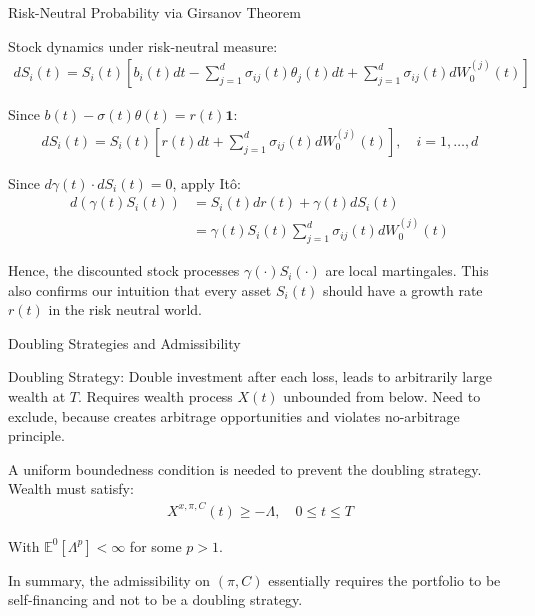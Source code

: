 \documentclass{beamer}
\begin{document}
\begin{frame}{Risk-Neutral Probability via Girsanov Theorem}

    {\footnotesize \footnotesize
    \par Stock dynamics under risk-neutral measure:
    \begin{align*}
        dS_i(t) = S_i(t) \left[ b_i(t)dt - \sum_{j=1}^d \sigma_{ij}(t)\theta_j(t)dt + \sum_{j=1}^d \sigma_{ij}(t)dW_0^{(j)}(t) \right]
    \end{align*}
    \par Since $b(t) - \sigma(t)\theta(t) = r(t)\mathbf{1}$:
    \begin{align*}
        dS_i(t) = S_i(t) \left[r(t)dt + \sum_{j=1}^d \sigma_{ij}(t)dW_0^{(j)}(t) \right], \quad i = 1, \ldots, d
    \end{align*}
    \par  \pause Since $d\gamma(t) \cdot dS_i(t) = 0$, apply Itô:
    \begin{align*}
        d(\gamma(t)S_i(t)) &= S_i(t)dr(t) + \gamma(t)dS_i(t) \\
        &= \gamma(t)S_i(t) \sum_{j=1}^d \sigma_{ij}(t)dW_0^{(j)}(t)
    \end{align*}
    \par  \pause  Hence, the discounted stock processes $\gamma(\cdot)S_i(\cdot)$ are local martingales.
     This also confirms our intuition that every asset $S_i(t)$ should have a growth rate $r(t)$ in the risk neutral world.
    }   
\end{frame} 

\begin{frame}{Doubling Strategies and Admissibility}

    {\footnotesize \footnotesize
    \par Doubling Strategy: Double investment after each loss, leads to arbitrarily large wealth at $T$. 
    Requires wealth process $X(t)$ unbounded from below. Need to exclude, because creates arbitrage opportunities and 
    violates no-arbitrage principle.
    \vspace{1em}
    \par  \pause A uniform boundedness condition is needed to prevent the doubling strategy. Wealth must satisfy:
    \begin{align*}
        X^{x,\pi,C}(t) \geq -\Lambda, \quad 0 \leq t \leq T
    \end{align*}
    \par  With $\mathbb{E}^0[\Lambda^p] < \infty$ for some $p > 1$.
    \vspace{1em}
    \par  \pause In summary, the admissibility on $(\pi,C)$ essentially requires the portfolio to
    be self-financing and not to be a doubling strategy.
    }
\end{frame} 
\end{document}
